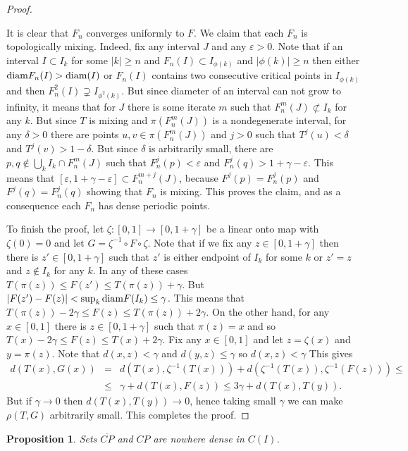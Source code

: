 \documentclass[12pt, a4paper]{amsart}
\newtheorem{proposition}[theorem]{Proposition}
\def\eps{\varepsilon}
\def\diam{\mbox{\rm diam} }
\newcommand{\?}{{\bf ???}}
\def\CP{\overline{CP}}
\begin{document}
\begin{proof}
\begin{enumerate}
\end{enumerate}
It is clear that $F_n$ converges uniformly to $F$. We claim that each $F_n$ is topologically mixing. Indeed, fix any interval $J$ and any $\eps>0$.
Note that if an interval $I\subset I_k$ for some $|k|\geq n$ and $F_n(I)\subset I_{\phi(k)}$ and $|\phi(k)|\geq n$ then either $\diam F_n(I)>\diam(I)$
or $F_n(I)$ contains two consecutive critical points in $I_{\phi(k)}$ and then $F_n^2(I)\supsetneq I_{\phi^2(k)}$. But since diameter of an interval can not grow
to infinity, it means that for $J$ there is some iterate $m$ such that $F_n^m(J)\not\subset I_k$ for any $k$. But since $T$ is mixing and $\pi(F_n^m(J))$
is a nondegenerate interval, for any $\delta>0$ there are points $u,v\in \pi(F_n^m(J))$ and $j>0$ such that $T^j(u)< \delta$ and $T^j(v)>1-\delta$.
But since $\delta$ is arbitrarily small, there are $p,q\not\in \bigcup_{k}I_k\cap F_n^m(J)$ such that $F_n^j(p)<\eps$ and $F_n^j(q)>1+\gamma-\eps$. This means
that $[\eps,1+\gamma-\eps]\subset F_n^{m+j}(J)$, because $F^j(p)=F^j_n(p)$ and $F^j(q)=F^j_n(q)$ showing that $F_n$ is mixing. This proves the claim, and as a consequence each $F_n$ has dense periodic points.

To finish the proof, let $\zeta\colon [0,1]\to [0,1+\gamma]$ be a linear onto map with $\zeta(0)=0$
and let $G=\zeta^{-1}\circ F\circ \zeta$.
Note that if we fix any $z\in [0,1+\gamma]$ then there is $z'\in [0,1+\gamma]$ such that $z'$ is either endpoint of $I_k$ for some $k$ or $z'=z$
and $z\not\in I_k$ for any $k$.
In any of these cases $T(\pi(z))\leq F(z')\leq T(\pi(z))+\gamma$.
But $|F(z')-F(z)|<\sup_{k}\diam F(I_k)\leq \gamma$. This means that 
$T(\pi(z))-2\gamma\leq F(z)\leq T(\pi(z))+2\gamma$.
On the other hand, for any $x\in [0,1]$
there is $z\in [0,1+\gamma]$ such that $\pi(z)=x$ and so
$T(x)-2\gamma\leq F(z)\leq T(x)+2\gamma$.
Fix any $x\in [0,1]$ and let $z=\zeta(x)$ and $y=\pi(z)$. Note that $d(x,z)<\gamma$
and $d(y,z)\leq \gamma$ so $d(x,z)<\gamma$
This gives
\begin{eqnarray*}
d(T(x),G(x))&=&d(T(x),\zeta^{-1}(T(x))) + d(\zeta^{-1}(T(x)),\zeta^{-1}(F(z))) \leq
\\
&\leq& \gamma+d(T(x),F(z))\leq 3\gamma+d(T(x),T(y)).
\end{eqnarray*}
But if $\gamma\to 0$ then $d(T(x),T(y))\to 0$, hence taking small $\gamma$
we can make $\rho(T,G)$ arbitrarily small.
This completes the proof.
\end{proof}


\begin{proposition}
Sets $\CP$ and $CP$ are nowhere dense in $C(I)$.
\end{proposition}
\end{document}
